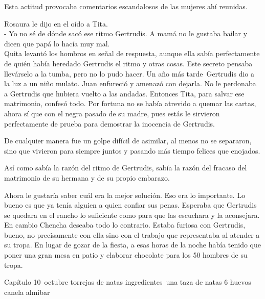 Esta actitud provocaba comentarios escandalosos de las mujeres ahí
reunidas.

Rosaura le dijo en el oído a Tita.
\\- Yo no sé de dónde sacó ese ritmo Gertrudis. A mamá no le gustaba %
bailar y dicen que papá lo hacía muy mal.\\

Quita levantó los hombros en señal de respuesta, aunque ella sabía
perfectamente de quién había heredado Gertrudis el ritmo y otras cosas.
Este secreto pensaba llevárselo a la tumba, pero no lo pudo hacer. Un
año más tarde~Gertrudis dio a la luz a un niño mulato. Juan
enfureció y amenazó con dejarla. No le perdonaba a Gertrudis que hubiera
vuelto a las andadas. Entonces Tita, para salvar ese matrimonio, confesó
todo. Por fortuna no se había atrevido a quemar las cartas, ahora sí que
con el \glqq{}negra pasado\grqq{} de su madre, pues estás le sirvieron perfectamente
de prueba para demostrar la inocencia de Gertrudis.

De cualquier manera fue un golpe difícil de asimilar, al menos no se
separaron, sino que vivieron para siempre juntos y pasando más tiempo
felices que enojados.

Así como sabía la razón del ritmo de Gertrudis, sabía la razón del
fracaso del matrimonio de su hermana y de su propio embarazo.

Ahora le gustaría saber cuál era la mejor solución. Eso era lo
importante. Lo bueno es que ya tenía alguien a quien confiar sus penas.
Esperaba que Gertrudis se quedara en el rancho lo suficiente como para
que las escuchara y la aconsejara. En cambio Chencha deseaba todo lo
contrario. Estaba furiosa con Gertrudis, bueno, no precisamente con ella
sino con el trabajo que representaba al atender a su tropa. En lugar de
gozar de la fiesta, a esas horas de la noche había tenido que poner una
gran mesa en patio y elaborar chocolate para los 50 hombres de su tropa.

Capítulo 10~octubre
torrejas de natas
ingredientes~una taza de natas
6 huevos
canela
almíbar

